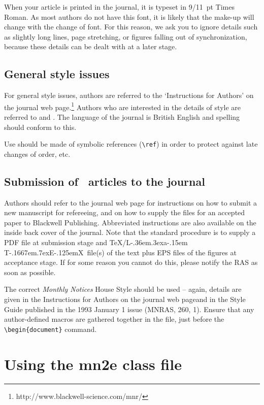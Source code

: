\documentclass[useAMS,usenatbib]{mn2e}
\def\LaTeX{L\kern-.36em\raise.3ex\hbox{a}\kern-.15em
    T\kern-.1667em\lower.7ex\hbox{E}\kern-.125emX}
\begin{document}
When your article is printed in the journal, it is typeset in 9/11~pt
Times Roman. As most authors do not have this font, it is likely that the make-up
will change with the change of font. For this reason, we ask you to ignore
details such as slightly long lines, page stretching, or figures falling
out of synchronization, because these details can be dealt with at a later
stage.

\subsection{General style issues}

For general style issues, authors are referred to the `Instructions for
 Authors' on the journal web page.\footnote{http://www.blackwell-science.com/mnr/}
Authors who are interested in the details of style are referred to
\citet{bu} and \citet{ch}. The language of the journal is British
English and spelling should conform to this.

Use should be made of symbolic references (\verb"\ref") in order to
protect against late changes of order, etc.

\subsection{Submission of \LaTeXe\ articles to the journal}

Authors should refer to the journal web page for instructions on how to
submit a new manuscript for refereeing, and on how to supply the files for
an accepted paper to Blackwell Publishing. Abbreviated instructions are
also available on the inside back cover of the journal. Note that the
standard procedure is to supply a PDF file at submission stage and
\TeX/\LaTeX\ file(s) of the text plus EPS files of the figures at
acceptance stage. If for some reason you cannot do this, please notify the
RAS as soon as possible.

The correct \textit{Monthly Notices} House Style should be used --
again, details are given in the Instructions for Authors on the
journal web page\footnotemark[1] and in the Style Guide published
in the 1993 January 1 issue (\mbox{MNRAS}, 260, 1). Ensure that
any author-defined macros are gathered together in the file, just
before the \verb"\begin{document}" command.

\section{Using the mn2e class file}
\end{document}
